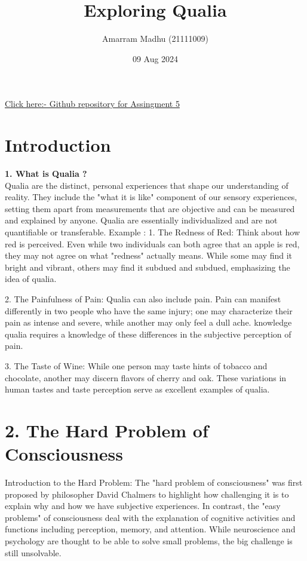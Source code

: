 \documentclass{article}
\title{Exploring Qualia}
\author{Amarram Madhu (21111009)}
\date{09 Aug 2024}
\begin{document}
\maketitle
\href{https://github.com/Vipin70Sahu/Assingment.git}{Click here:- Github repository for Assingment 5}
\section{Introduction}


\textbf{ 1. What is Qualia ? } \\
\LARGE Qualia are the distinct, personal experiences that shape our understanding of reality. They include the "what it is like" component of our sensory experiences, setting them apart from measurements that are objective and can be measured and explained by anyone. Qualia are essentially individualized and are not quantifiable or transferable.
\LARGE Example :
\LARGE 
1. The Redness of Red: Think about how red is perceived. Even while two individuals can both agree that an apple is red, they may not agree on what "redness" actually means. While some may find it bright and vibrant, others may find it subdued and subdued, emphasizing the idea of qualia.

2. The Painfulness of Pain: Qualia can also include pain. Pain can manifest differently in two people who have the same injury; one may characterize their pain as intense and severe, while another may only feel a dull ache. knowledge qualia requires a knowledge of these differences in the subjective perception of pain.

3. The Taste of Wine: While one person may taste hints of tobacco and chocolate, another may discern flavors of cherry and oak. These variations in human tastes and taste perception serve as excellent examples of qualia.
\vspace{2em}

\section*{2. The Hard Problem of Consciousness  } 
Introduction to the Hard Problem:
The "hard problem of consciousness" was first proposed by philosopher David Chalmers to highlight how challenging it is to explain why and how we have subjective experiences. In contrast, the "easy problems" of consciousness deal with the explanation of cognitive activities and functions including perception, memory, and attention. While neuroscience and psychology are thought to be able to solve small problems, the big challenge is still unsolvable.
\end{document}
